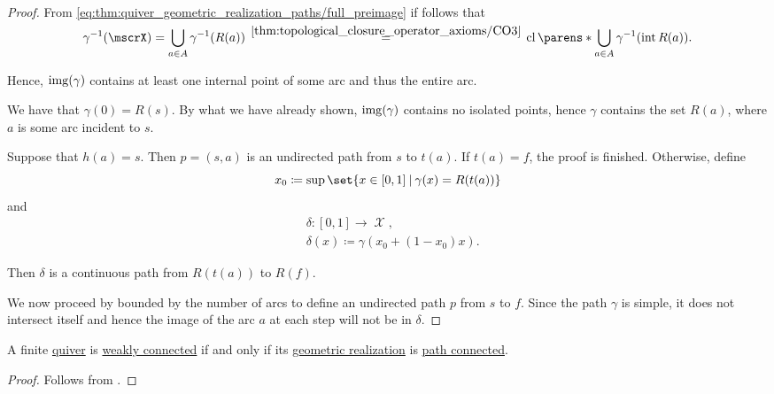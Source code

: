\begin{proof}
   From \eqref{eq:thm:quiver_geometric_realization_paths/full_preimage} if follows that
  \begin{equation*}
    \gamma^{-1}(\mscrX)
    =
    \bigcup_{a \in A} \gamma^{-1}(R(a))
    \reloset{\ref{thm:topological_closure_operator_axioms/CO3}} =
    \cl\parens*{ \bigcup_{a \in A} \gamma^{-1}(\Int R(a)) }.
  \end{equation*}

  Hence, \( \operatorname{img}(\gamma) \) contains at least one internal point of some arc and thus the entire arc.

   We have that \( \gamma(0) = R(s) \). By what we have already shown, \( \operatorname{img}(\gamma) \) contains no isolated points, hence \( \gamma \) contains the set \( R(a) \), where \( a \) is some arc incident to \( s \).

  Suppose that \( h(a) = s \). Then \( p = (s, a) \) is an undirected path from \( s \) to \( t(a) \). If \( t(a) = f \), the proof is finished. Otherwise, define
  \begin{equation*}
    x_0 \coloneqq \sup\set{ x \in [0, 1] \given \gamma(x) = R(t(a)) }
  \end{equation*}
  and
  \begin{equation*}
    \begin{aligned}
      &\delta: [0, 1] \to \mscrX, \\
      &\delta(x) \coloneqq \gamma(x_0 + (1 - x_0) x).
    \end{aligned}
  \end{equation*}

  Then \( \delta \) is a continuous path from \( R(t(a)) \) to \( R(f) \).

  We now proceed by  bounded by the number of arcs to define an undirected path \( p \) from \( s \) to \( f \). Since the path \( \gamma \) is simple, it does not intersect itself and hence the image of the arc \( a \) at each step will not be in \( \delta \).
\end{proof}

\begin{corollary}\label{thm:quiver_geometric_realization_connectedness}
  A finite \hyperref[def:quiver]{quiver} is \hyperref[def:quiver_connectedness/weak]{weakly connected} if and only if its \hyperref[def:quiver_geometric_realization/undirected]{geometric realization} is \hyperref[def:path_connected]{path connected}.
\end{corollary}
\begin{proof}
  Follows from .
\end{proof}

